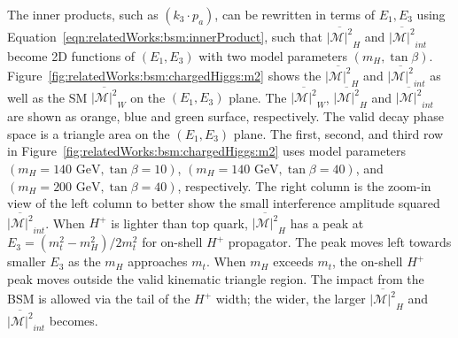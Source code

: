 \noindent The inner products, such as $(k_3 \cdot p_a) $, can be rewritten in terms of $E_1, E_3$ using Equation~\ref{eqn:relatedWorks:bsm:innerProduct}, such that $\overline{ |\mathcal{M}|^2 } _{H}$ and $ \overline{ |\mathcal{M}|^2 } _{int}$ become 2D functions of $(E_1, E_3)$  with two model parameters $(m_H, \tan\beta)$. Figure~\ref{fig:relatedWorks:bsm:chargedHiggs:m2} shows the $\overline{ |\mathcal{M}|^2 } _{H}$ and $ \overline{ |\mathcal{M}|^2 } _{int}$ as well as the SM $\overline{ |\mathcal{M}|^2 } _{W}$ on the $(E_1, E_3)$  plane. The $\overline{ |\mathcal{M}|^2 } _{W}$, $\overline{ |\mathcal{M}|^2 } _{H} $ and $\overline{ |\mathcal{M}|^2 } _{int}$ are shown as orange, blue and green surface, respectively. The valid decay phase space is a triangle area on the  $(E_1, E_3)$ plane. The first, second, and third row in Figure~\ref{fig:relatedWorks:bsm:chargedHiggs:m2} uses model parameters $(m_H = 140 \text{ GeV}, \tan\beta=10)$, $(m_H = 140 \text{ GeV}, \tan\beta=40)$, and $(m_H = 200 \text{ GeV}, \tan\beta=40)$, respectively. The right column is the zoom-in view of the left column to better show the small interference amplitude squared $ \overline{ |\mathcal{M}|^2 } _{int}$. When $H^+$ is lighter than top quark, $\overline{ |\mathcal{M}|^2 } _{H}$ has a peak at $E_3=(m_t^2-m_H^2)/2m_t^2$ for on-shell $H^+$ propagator. The peak moves left towards smaller $E_3$ as the $m_H$ approaches $m_t$. When $m_H$ exceeds $m_t$, the on-shell $H^+$ peak moves outside the valid kinematic triangle region. The impact from the BSM is allowed via the tail of the $H^+$ width; the wider, the larger $\overline{ |\mathcal{M}|^2 } _{H}$ and $ \overline{ |\mathcal{M}|^2 } _{int}$ becomes.

